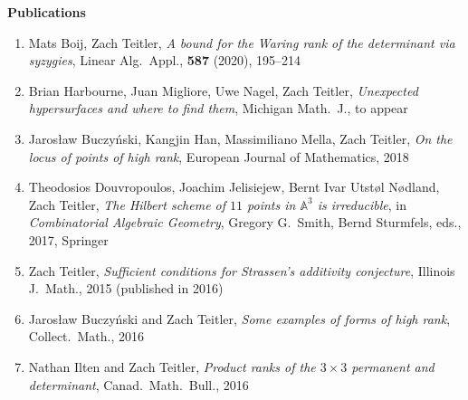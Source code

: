 \documentclass[12pt]{article}
\begin{document}





\textbf{Publications}
\begin{enumerate}[revarabic,leftmargin=*]

\item Mats Boij, Zach Teitler,
\emph{A bound for the Waring rank of the determinant via syzygies},
Linear Alg.\ Appl.,
\textbf{587}
(2020), 195--214

\item Brian Harbourne, Juan Migliore, Uwe Nagel, Zach Teitler,
\emph{Unexpected hypersurfaces and where to find them},
Michigan Math.\ J., to appear

\item Jaros{\l}aw Buczy\'nski, Kangjin Han, Massimiliano Mella, Zach Teitler,
\emph{On the locus of points of high rank},
European Journal of Mathematics, 2018

\item Theodosios Douvropoulos, Joachim Jelisiejew, Bernt Ivar Utst{\o}l N{\o}dland, Zach Teitler,
\emph{The Hilbert scheme of $11$ points in $\mathbb{A}^3$ is irreducible},
in \emph{Combinatorial Algebraic Geometry}, Gregory G.\ Smith, Bernd Sturmfels, eds., 2017, Springer

\item Zach Teitler,
\emph{Sufficient conditions for Strassen's additivity conjecture},
Illinois J.\ Math.,
2015
(published in 2016)

\item Jaros{\l}aw Buczy\'nski and Zach Teitler,
\emph{Some examples of forms of high rank},
Collect.\ Math.,
2016

\item Nathan Ilten and Zach Teitler,
\emph{Product ranks of the $3 \times 3$ permanent and determinant},
Canad.\ Math.\ Bull.,
2016


\end{enumerate}
\end{document}
